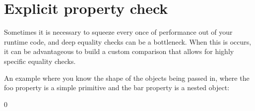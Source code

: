 \chapter{Explicit property check }
\hypertarget{md__c_1_2_users_2saket_2_one_drive_2_desktop_2e_pathshala_2epathshala-_web_2node__modules_2fast-11d8a22884731701989debc1d6b48bf7}{}\label{md__c_1_2_users_2saket_2_one_drive_2_desktop_2e_pathshala_2epathshala-_web_2node__modules_2fast-11d8a22884731701989debc1d6b48bf7}
\label{md__c_1_2_users_2saket_2_one_drive_2_desktop_2e_pathshala_2epathshala-_web_2node__modules_2fast-11d8a22884731701989debc1d6b48bf7_autotoc_md11108}%
%


Sometimes it is necessary to squeeze every once of performance out of your runtime code, and deep equality checks can be a bottleneck. When this is occurs, it can be advantageous to build a custom comparison that allows for highly specific equality checks.

An example where you know the shape of the objects being passed in, where the {\ttfamily foo} property is a simple primitive and the {\ttfamily bar} property is a nested object\+:


\begin{DoxyCode}{0}
\DoxyCodeLine{}
\DoxyCodeLine{\ \ \};}
\DoxyCodeLine{\}}
\DoxyCodeLine{}
\DoxyCodeLine{}
\DoxyCodeLine{\});}

\end{DoxyCode}
 